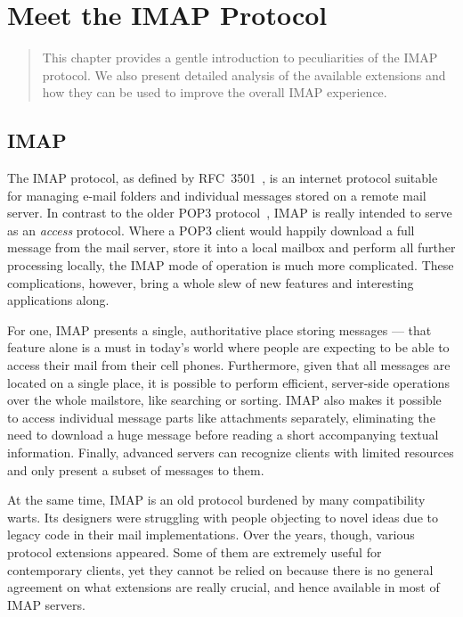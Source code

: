 \documentclass[trojita]{subfiles}
\begin{document}
\chapter{Meet the IMAP Protocol}
\label{sec:imap-protocol}

\begin{abstract}
This chapter provides a gentle introduction to peculiarities of the IMAP protocol.  We also present detailed analysis of
the available extensions and how they can be used to improve the overall IMAP experience.
\end{abstract}

\section{IMAP}

The IMAP protocol, as defined by RFC~3501~\cite{rfc3501}, is an internet protocol suitable for managing e-mail folders
and individual messages stored on a remote mail server.  In contrast to the older POP3 protocol~\cite{rfc1939}, IMAP is
really intended to serve as an {\em access} protocol.  Where a POP3 client would happily download a full message from
the mail server, store it into a local mailbox and perform all further processing locally, the IMAP mode of operation is
much more complicated.  These complications, however, bring a whole slew of new features and interesting applications
along.

For one, IMAP presents a single, authoritative place storing messages --- that feature alone is a must in today's world
where people are expecting to be able to access their mail from their cell phones.  Furthermore, given that all messages
are located on a single place, it is possible to perform efficient, server-side operations over the whole mailstore,
like searching or sorting.  IMAP also makes it possible to access individual message parts like attachments separately,
eliminating the need to download a huge message before reading a short accompanying textual information.  Finally,
advanced servers can recognize clients with limited resources and only present a subset of messages to them.

At the same time, IMAP is an old protocol burdened by many compatibility warts.  Its designers were struggling with
people objecting to novel ideas due to legacy code in their mail implementations.  Over the years, though, various
protocol extensions appeared.  Some of them are extremely useful for contemporary clients, yet they cannot be relied on
because there is no general agreement on what extensions are really crucial, and hence available in most of IMAP
servers.
\end{document}
